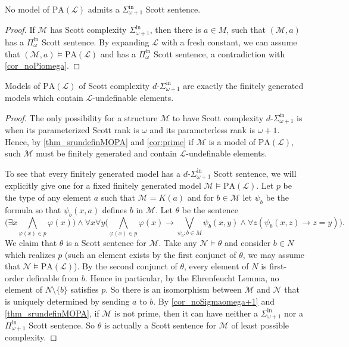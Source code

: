 \documentclass[11pt]{amsart}
\newcommand{\M}{\mathcal{M}}
\newcommand{\mc}[1]{\mathcal{#1}}
\newcommand{\Pinf}[1]{\Pi^{\mathrm{in}}_{#1}}
\newcommand{\Sinf}[1]{\Sigma^{\mathrm{in}}_{#1}}
\newcommand{\dSinf}[1]{d\text{-}\Sigma^{\mathrm{in}}_{#1}}
\newcommand{\PA}{\mathrm{PA}}
\renewcommand{\phi}{\varphi}
\def\M{{\mathcal M}}
\theoremstyle{remark}
\begin{document}
\begin{corollary}\label{cor_noSigmaomega+1}
    No model of $\PA(\mathcal{L})$ admits a $\Sinf{\omega+1}$ Scott sentence.
\end{corollary}
\begin{proof}
	If $\mc{M}$ has Scott complexity $\Sinf{\omega+1}$, then there is $a\in M$, such that $(\mc{M},a)$ has a $\Pinf{\omega}$ Scott sentence. By expanding $\mathcal{L}$ with a fresh constant, we can assume that $(\mc{M},a)\models \PA(\mathcal{L})$ and has a $\Pinf{\omega}$ Scott sentence, a contradiction with \cref{cor_noPiomega}.
    
\end{proof}
\begin{proposition}\label{prop_fingenchar}
  Models of $\PA(\mathcal{L})$ of Scott complexity $\dSinf{\omega+1}$ are exactly the finitely generated models which contain $\mathcal{L}$-undefinable elements.
\end{proposition}
\begin{proof}
    The only possibility for a structure $\mc{M}$ to have Scott complexity $\dSinf{\omega+1}$ is when its parameterized Scott rank is $\omega$ and its parameterless rank is $\omega+1$. Hence, by \cref{thm_srundefinMOPA} and \cref{cor:prime} if $\mc{M}$ is a model of $\PA(\mathcal{L})$, such $\mc{M}$ must be finitely generated and contain $\mathcal{L}$-undefinable elements.

		To see that every finitely generated model has a $\dSinf{\omega+1}$ Scott sentence, we will explicitly give one for a fixed finitely generated model $\mc{M}\models \PA(\mathcal{L})$. Let $p$ be the type of any element $a$ such that $\mc{M} = K(a)$ and for $b\in \M$ let $\psi_b$ be the formula so that $\psi_b(x,a)$ defines $b$ in $\mc M$. Let $\theta$ be the sentence
    \[\bigl(\exists x \bigwedge_{\phi(x)\in p}\phi(x)\bigr) \wedge \forall x \forall y \bigl(\bigwedge_{\phi(x)\in p}\phi(x)\rightarrow \bigvee_{\psi_b:b\in M} \psi_b(x,y)\wedge \forall z (\psi_b(x,z)\rightarrow z=y)\bigr).\]
    We claim that $\theta$ is a Scott sentence for $\mc{M}$. Take any $\mc{N}\models \theta$ and consider $b\in N$ which realizes $p$ (such an element exists by the first conjunct of $\theta$, we may assume that $\mc{N}\models \PA(\mathcal{L})$). By the second conjunct of $\theta$, every element of $N$ is first-order definable from $b$. Hence in particular, by the Ehrenfeucht Lemma, no element of $N\setminus\{b\}$ satisfies $p$. So there is an isomorphism between $\mc{M}$ and $\mc{N}$ that is uniquely determined by sending $a$ to $b$. 
    By \cref{cor_noSigmaomega+1} and \cref{thm_srundefinMOPA}, if $\mc{M}$ is not prime, then it can have neither a $\Sinf{\omega+1}$ nor a $\Pinf{\omega+1}$ Scott sentence. So $\theta$ is actually a Scott sentence for $\mc{M}$ of least possible complexity.
\end{proof}
\end{document}
